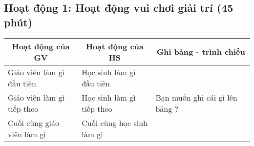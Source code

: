 \documentclass[12pt,a4paper]{article}
\newcommand*{\thead}[1]{\multicolumn{1}{c}{\bfseries #1}}
\begin{document}
	\subsection{Hoạt động 1: Hoạt động vui chơi giải trí (45 phút)}
	\begin{longtable}{ p{0.3\linewidth} p{0.3\linewidth} p{0.4\linewidth} }
		\toprule
		\thead{Hoạt động của GV}
		& 
		\thead{Hoạt động của HS}
		& 
		\thead{Ghi bảng - trình chiếu}
		\\ \midrule
		\endhead
		Giáo viên làm gì đầu tiên
		&
		Học sinh làm gì đầu tiên
		&  
		\multirow[t]{3}{*}{
			Bạn muốn ghi cái gì lên bảng ?
		}
		\\ \cmidrule{1-2}
		Giáo viên làm gì tiếp theo
		& 
		Học sinh làm gì tiếp theo
		&  
		\\ \cmidrule{1-2}
		Cuối cùng giáo viên làm gì
		&
		Cuối cùng học sinh làm gì
		&
		\\ \bottomrule
	\end{longtable}
\end{document}
